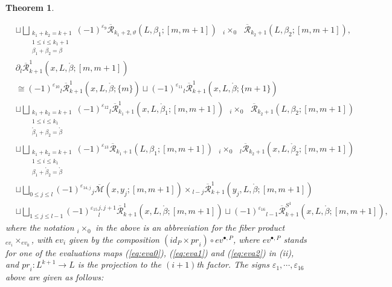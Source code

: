 \documentclass[a4paper]{article}
\newtheorem{theorem}{Theorem}
\numberwithin{equation}{section}
\begin{document}
\begin{theorem}
\begin{itemize}
\begin{equation}
\begin{split}
    &\sqcup\bigsqcup_{\substack{k_1+k_2=k+1\\1\leq i\leq k_1+1\\ \beta_1+\beta_2=\beta}}(-1)^{\varepsilon_{9}}\overline{\mathcal{R}}_{k_1+2,\vartheta}(L,\beta_1;[m,m+1])\textrm{ }{{}_i\times_0}\textrm{ }\overline{\mathcal{R}}_{k_2+1}(L,\beta_2;[m,m+1]),
    \end{split}
    \end{equation}
    \begin{equation}\label{eq:bd5}
    \begin{split}
    &\partial{}_l\overline{\mathcal{R}}_{k+1}^1(x,L,\ring{\beta};[m,m+1]) \\
    &\cong(-1)^{\varepsilon_{10}}{}_l\overline{\mathcal{R}}_{k+1}^1(x,L,\ring{\beta};\{m\})\sqcup(-1)^{\varepsilon_{11}}{}_l\overline{\mathcal{R}}_{k+1}^1(x,L,\ring{\beta};\{m+1\}) \\
    &\sqcup\bigsqcup_{\substack{k_1+k_2=k+1\\1\leq i\leq k_1\\ \ring{\beta}_1+\beta_2=\ring{\beta}}}(-1)^{\varepsilon_{12}}{}_l\overline{\mathcal{R}}_{k_1+1}^1(x,L,\ring{\beta}_1;[m,m+1])\textrm{ }{{}_i\times_0}\textrm{ }\overline{\mathcal{R}}_{k_2+1}(L,\beta_2;[m,m+1]) \\
    &\sqcup\bigsqcup_{\substack{k_1+k_2=k+1\\1\leq i\leq k_1\\ \beta_1+\ring{\beta}_2=\ring{\beta}}}(-1)^{\varepsilon_{13}}\overline{\mathcal{R}}_{k_1+1}(L,\beta_1;[m,m+1])\textrm{ }{{}_i\times_0}\textrm{ }{}_l\overline{\mathcal{R}}_{k_2+1}(x,L,\ring{\beta}_2;[m,m+1])\\
    &\sqcup\bigsqcup_{0\leq j\leq l}(-1)^{\varepsilon_{14,j}}{}_j\overline{\mathcal{M}}(x,y_j;[m,m+1])\times{}_{l-j}\overline{\mathcal{R}}_{k+1}^1(y_j,L,\ring{\beta};[m,m+1]) \\
    &\sqcup\bigsqcup_{1\leq j\leq l-1}(-1)^{\varepsilon_{15}}{}_l^{j,j+1}\overline{\mathcal{R}}_{k+1}^1(x,L,\ring{\beta};[m,m+1])\sqcup(-1)^{\varepsilon_{16}}{}_{l-1}\overline{\mathcal{R}}_{k+1}^{S^1}(x,L,\ring{\beta};[m,m+1]),
    \end{split}
    \end{equation}
    where the notation ${{}_i\times_0}$ in the above is an abbreviation for the fiber product ${{}_{\mathit{ev}_i}\times_{\mathit{ev}_0}}$, with $\mathit{ev}_i$ given by the composition $(\mathit{id}_P\times\mathit{pr}_i)\circ\mathit{ev}^{\bullet,P}$, where $\mathit{ev}^{\bullet,P}$ stands for one of the evaluations maps (\ref{eq:eva0}), (\ref{eq:eva1}) and (\ref{eq:eva2}) in (ii), and $\mathit{pr}_i:L^{k+1}\rightarrow L$ is the projection to the $(i+1)$th factor. The signs $\varepsilon_1,\cdots,\varepsilon_{16}$ above are given as follows:

\end{itemize}
\end{theorem}
\end{document}

